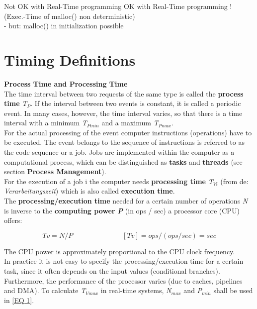 Not OK with Real-Time programming   \hspace{2cm} OK with Real-Time programming !\\
(Exec.-Time of malloc() non deterministic)\\
- but: malloc() in initialization possible  

\section{Timing Definitions}

{\rot\bf Process Time and Processing Time}\\

The time interval between two requests of the same type is called the \textbf{process time} \textit{T${}_{P}$}. If the interval between two events is constant, it is called a periodic event. In many cases, however, the time interval varies, so that there is a time interval with a minimum \textit{T${}_{Pmin}$} and a maximum \textit{T${}_{Pmax}$}.\\

For the actual processing of the event computer instructions (operations) have to be executed. The event belongs to the sequence of instructions is referred to as the code sequence or a job. Jobs are implemented within the computer as a computational process, which can be distinguished as \textbf{tasks} and \textbf{threads} (see section \textbf{Process Management}). \\

For the execution of a job i the computer needs \textbf{processing time} \textit{T${}_{Vi}$} (from de: \textit{Verarbeitungszeit}) which is also called \textbf{execution time}.\\

The \textbf{processing/execution time }needed for a certain number of operations \textit{N} is inverse to the \textbf{computing power} \textbf{\textit{P}} (in ops / sec) a processor core (CPU) offers:

\begin{equation}
	Tv = N / P \hspace{3cm} [Tv] = ops / (ops / sec) = sec
\label{EQ 1}
\end{equation}

The CPU power is approximately proportional to the CPU clock frequency.\\

In practice it is not easy to specify the processing/execution time for a certain task, since it often depends on the input values (conditional branches). Furthermore, the performance of the processor varies (due to caches, pipelines and DMA). To calculate \textit{T${}_{Vmax}$} in real-time systems, \textit{N${}_{max}$} and \textit{P${}_{min}$} shall be used in \ref{EQ 1}.

